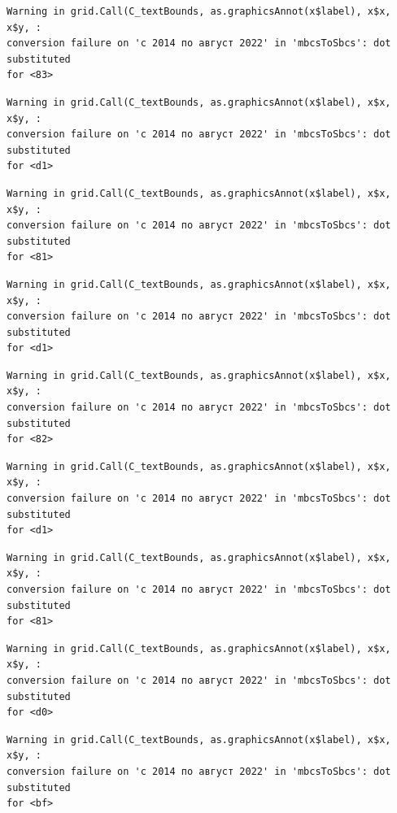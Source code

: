\documentclass[
  letterpaper,
  DIV=11,
  numbers=noendperiod]{scrartcl}
\begin{document}
\begin{verbatim}
Warning in grid.Call(C_textBounds, as.graphicsAnnot(x$label), x$x, x$y, :
conversion failure on 'с 2014 по август 2022' in 'mbcsToSbcs': dot substituted
for <83>
\end{verbatim}

\begin{verbatim}
Warning in grid.Call(C_textBounds, as.graphicsAnnot(x$label), x$x, x$y, :
conversion failure on 'с 2014 по август 2022' in 'mbcsToSbcs': dot substituted
for <d1>
\end{verbatim}

\begin{verbatim}
Warning in grid.Call(C_textBounds, as.graphicsAnnot(x$label), x$x, x$y, :
conversion failure on 'с 2014 по август 2022' in 'mbcsToSbcs': dot substituted
for <81>
\end{verbatim}

\begin{verbatim}
Warning in grid.Call(C_textBounds, as.graphicsAnnot(x$label), x$x, x$y, :
conversion failure on 'с 2014 по август 2022' in 'mbcsToSbcs': dot substituted
for <d1>
\end{verbatim}

\begin{verbatim}
Warning in grid.Call(C_textBounds, as.graphicsAnnot(x$label), x$x, x$y, :
conversion failure on 'с 2014 по август 2022' in 'mbcsToSbcs': dot substituted
for <82>
\end{verbatim}

\begin{verbatim}
Warning in grid.Call(C_textBounds, as.graphicsAnnot(x$label), x$x, x$y, :
conversion failure on 'с 2014 по август 2022' in 'mbcsToSbcs': dot substituted
for <d1>
\end{verbatim}

\begin{verbatim}
Warning in grid.Call(C_textBounds, as.graphicsAnnot(x$label), x$x, x$y, :
conversion failure on 'с 2014 по август 2022' in 'mbcsToSbcs': dot substituted
for <81>
\end{verbatim}

\begin{verbatim}
Warning in grid.Call(C_textBounds, as.graphicsAnnot(x$label), x$x, x$y, :
conversion failure on 'с 2014 по август 2022' in 'mbcsToSbcs': dot substituted
for <d0>
\end{verbatim}

\begin{verbatim}
Warning in grid.Call(C_textBounds, as.graphicsAnnot(x$label), x$x, x$y, :
conversion failure on 'с 2014 по август 2022' in 'mbcsToSbcs': dot substituted
for <bf>
\end{verbatim}
\end{document}
